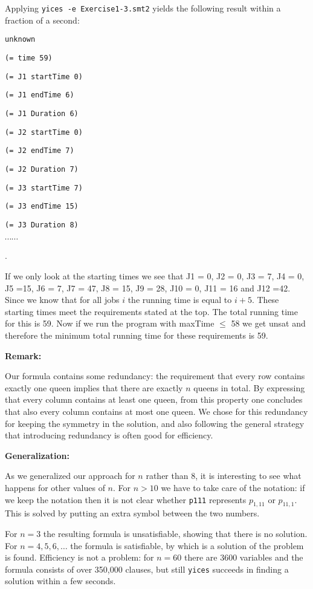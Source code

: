 \documentclass[12pt]{article}
\begin{document}
Applying {\tt yices -e Exercise1-3.smt2} yields the following result
within a fraction of a second:

{\footnotesize

{\tt unknown}

{\tt (= time 59)}

{\tt (= J1 startTime 0)}

{\tt (= J1 endTime 6)}

{\tt (= J1 Duration 6)}

{\tt (= J2 startTime 0)}

{\tt (= J2 endTime 7)}

{\tt (= J2 Duration 7)}

{\tt (= J3 startTime 7)}

{\tt (= J3 endTime 15)}

{\tt (= J3 Duration 8)}

$\cdots \cdots$ }.

If we only look at the starting times we see that J1 = 0, J2 = 0, J3 = 7, J4 = 0, J5 =15, J6 = 7, J7 = 47, J8 = 15, J9 = 28, J10 = 0, J11 = 16 and J12 =42.  Since we know that for all jobs $i$ the running time is equal to $i + 5$. These starting times meet the requirements stated at the top. The total running time for this is 59. Now if we run the program with maxTime $\leq$ 58 we get unsat and therefore the minimum total running time for these requirements is 59.

\vspace{3mm}

{\bf Remark:} 

Our formula contains some redundancy: the requirement that every
row contains exactly one queen implies that there are exactly $n$
queens in total. By expressing that every column contains at least
one queen, from this property one concludes that also every column
contains at most one queen. We chose for this redundancy for
keeping the symmetry in the solution, and also following the
general strategy that introducing redundancy is often good for
efficiency.

\vspace{3mm}

{\bf Generalization:} 

As we generalized our approach for $n$ rather than 8, it is
interesting to see what happens for other values of $n$. For $n
> 10$ we have to take care of the notation: if we keep the
notation then it is not clear whether {\tt p111} represents 
$p_{1,11}$ or $p_{11,1}$. This is solved by putting an extra 
symbol between the two numbers. 

For $n=3$ the resulting formula is unsatisfiable, showing that
there is no solution. For $n = 4,5,6,\ldots$ the formula is
satisfiable, by which is a solution of the problem is found.
Efficiency is not a problem: for $n = 60$ there are 3600
variables and the formula consists of over 350,000 clauses, but 
still {\tt yices} succeeds in finding a solution within a few
seconds.
\end{document}
